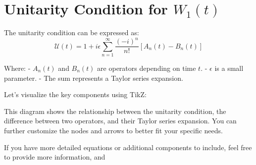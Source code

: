 \documentclass{article}
\begin{document}
\section*{Unitarity Condition for $W_1(t)$}

The unitarity condition can be expressed as:
\[ \mathcal{U}(t) = 1 + i\epsilon \sum_{n=1}^{\infty} \frac{(-i)^n}{n!} \left[ A_n(t) - B_n(t) \right] \]

Where:
- \(A_n(t)\) and \(B_n(t)\) are operators depending on time \(t\).
- \(\epsilon\) is a small parameter.
- The sum represents a Taylor series expansion.

Let's visualize the key components using TikZ:


This diagram shows the relationship between the unitarity condition, the difference between two operators, and their Taylor series expansion. You can further customize the nodes and arrows to better fit your specific needs.

If you have more detailed equations or additional components to include, feel free to provide more information, and
\end{document}
